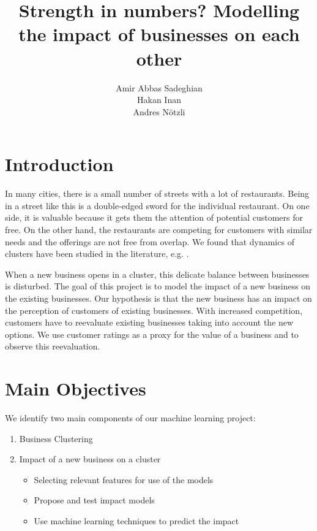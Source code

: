 \documentclass{vldb}
\begin{document}
\title{Strength in numbers? Modelling the impact of businesses on each other}


\author{
\alignauthor
Amir Abbas Sadeghian\\
\alignauthor
Hakan Inan\\
\alignauthor 
Andres N\"otzli\\
}

\maketitle

\section{Introduction}
In many cities, there is a small number of streets with a lot of restaurants.
Being in a street like this is a double-edged sword for the individual restaurant.
On one side, it is valuable because it gets them the attention of potential customers for free.
On the other hand, the restaurants are competing for customers with similar needs and the offerings are not free from overlap.
We found that dynamics of clusters have been studied in the literature, e.g. \cite{mccann2002industrial, porter1998clusters, schmitz1999global}.

When a new business opens in a cluster, this delicate balance between businesses is disturbed.
The goal of this project is to model the impact of a new business on the existing businesses.
Our hypothesis is that the new business has an impact on the perception of customers of existing businesses.
With increased competition, customers have to reevaluate existing businesses taking into account the new options.
We use customer ratings as a proxy for the value of a business and to observe this reevaluation.

\section*{Main Objectives}
We identify two main components of our machine learning project:
\begin{enumerate}
\item Business Clustering
\item Impact of a new business on a cluster
	\begin{itemize}
  \item Selecting relevant features for use of the models
 	 \item Propose and test impact models
 	 \item Use machine learning techniques to predict the impact
  	\end{itemize}
	
\end{enumerate}
\end{document}

